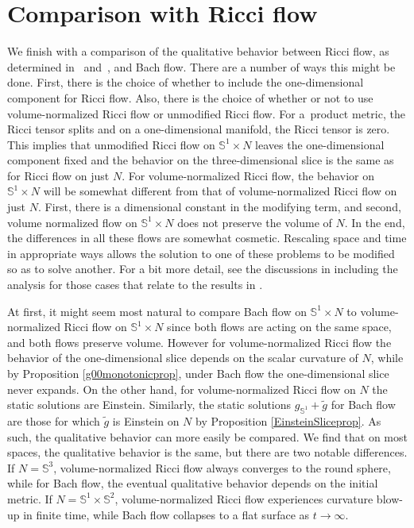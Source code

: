 \documentclass[10pt,a4paper]{amsart}
\numberwithin{equation}{section}
\begin{document}
\section{Comparison with Ricci flow} \label{riccompsec}

We finish with a comparison of the qualitative behavior between Ricci flow, as determined in~\cite{IJ} and~\cite{IJL}, and Bach flow. There are a number of ways this might be done. First, there is the choice of whether to include the one-dimensional component for Ricci flow. Also, there is the choice of whether or not to use volume-normalized Ricci flow or unmodified Ricci flow. For a~product metric, the Ricci tensor splits and on a one-dimensional manifold, the Ricci tensor is zero. This implies that unmodified Ricci flow on $\mathbb{S}^1 \times N$ leaves the one-dimensional component fixed and the behavior on the three-dimensional slice is the same as for Ricci flow on just $N$. For volume-normalized Ricci flow, the behavior on $\mathbb{S}^1 \times N$ will be somewhat different from that of volume-normalized Ricci flow on just $N$. First, there is a dimensional constant in the modifying term, and second, volume normalized flow on $\mathbb{S}^1 \times N$ does not preserve the volume of $N$. In the end, the differences in all these flows are somewhat cosmetic. Rescaling space and time in appropriate ways allows the solution to one of these problems to be modified so as to solve another. For a bit more detail, see the discussions in \cite{IJL} including the analysis for those cases that relate to the results in \cite{IJ}.

At first, it might seem most natural to compare Bach flow on $\mathbb{S}^1 \times N$ to volume-normalized Ricci flow on $\mathbb{S}^1 \times N$ since both flows are acting on the same space, and both flows preserve volume. However for volume-normalized Ricci flow the behavior of the one-dimensional slice depends on the scalar curvature of $N$, while by Proposition \ref{g00monotonicprop}, under Bach flow the one-dimensional slice never expands. On the other hand, for volume-normalized Ricci flow on $N$ the static solutions are Einstein. Similarly, the static solutions $g_{\mathbb{S}^1} \! + \tilde{g}$ for Bach flow are those for which $\tilde{g}$ is Einstein on $N$ by Proposition \ref{EinsteinSliceprop}. As such, the qualitative behavior can more easily be compared. We find that on most spaces, the qualitative behavior is the same, but there are two notable differences. If $N = \mathbb{S}^3$, volume-normalized Ricci flow always converges to the round sphere, while for Bach flow, the eventual qualitative behavior depends on the initial metric. If $N = \mathbb{S}^1 \times \mathbb{S}^2$, volume-normalized Ricci flow experiences curvature blow-up in finite time, while Bach flow collapses to a flat surface as $t \rightarrow \infty$.
\end{document}
